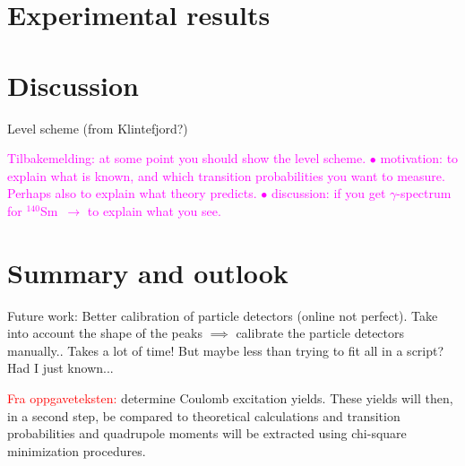 \documentclass[twoside,english]{uiofysmaster/uiofysmaster}
\newcommand{\Sm}{$^{140}$Sm} %
\newcommand{\ga}{$\gamma$}
\begin{document}
\chapter{Experimental results}




\chapter{Discussion}

Level scheme (from Klintefjord?)\newline

\textcolor{Magenta}{Tilbakemelding: \newline
at some point you should show the level scheme. \newline
$\bullet$ motivation: to explain what is known, and which transition probabilities you want to measure.  \newline
Perhaps also to explain what theory predicts. \newline
$\bullet$ discussion: if you get \ga-spectrum for \Sm ~$\rightarrow$ to explain what you see.}


\chapter{Summary and outlook}

Future work: Better calibration of particle detectors (online not perfect). Take into account the shape of the peaks $\implies$ calibrate the particle detectors manually.. Takes a lot of time! But maybe less than trying to fit all in a script? Had I just known...


\textcolor{red}{Fra oppgaveteksten:} \newline
determine Coulomb excitation yields. These yields will then, in a second step, be compared to theoretical calculations and transition probabilities and quadrupole moments will be extracted using chi-square minimization procedures.
\end{document}
